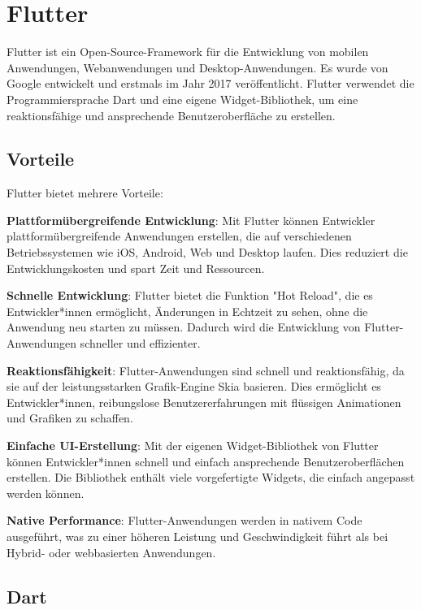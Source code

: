 \section{Flutter}
Flutter ist ein Open-Source-Framework für die Entwicklung von mobilen Anwendungen, Webanwendungen und Desktop-Anwendungen. 
Es wurde von Google entwickelt und erstmals im Jahr 2017 veröffentlicht. 
Flutter verwendet die Programmiersprache Dart und eine eigene Widget-Bibliothek, um eine reaktionsfähige und ansprechende Benutzeroberfläche zu erstellen.

\subsection{Vorteile}
Flutter bietet mehrere Vorteile:

\begin{compactitem}
    \item \textbf{Plattformübergreifende Entwicklung}: Mit Flutter können Entwickler plattformübergreifende Anwendungen erstellen, die auf verschiedenen Betriebssystemen wie iOS, 
    Android, Web und Desktop laufen. Dies reduziert die Entwicklungskosten und spart Zeit und Ressourcen.
    \item \textbf{Schnelle Entwicklung}: Flutter bietet die Funktion "Hot Reload", die es Entwickler*innen ermöglicht, Änderungen in Echtzeit zu sehen, 
    ohne die Anwendung neu starten zu müssen. Dadurch wird die Entwicklung von Flutter-Anwendungen schneller und effizienter.
    \item \textbf{Reaktionsfähigkeit}: Flutter-Anwendungen sind schnell und reaktionsfähig, da sie auf der leistungsstarken Grafik-Engine Skia basieren. 
    Dies ermöglicht es Entwickler*innen, reibungslose Benutzererfahrungen mit flüssigen Animationen und Grafiken zu schaffen.
    \item \textbf{Einfache UI-Erstellung}: Mit der eigenen Widget-Bibliothek von Flutter können Entwickler*innen schnell und einfach ansprechende Benutzeroberflächen erstellen. 
    Die Bibliothek enthält viele vorgefertigte Widgets, die einfach angepasst werden können.
    \item \textbf{Native Performance}: Flutter-Anwendungen werden in nativem Code ausgeführt, was zu einer höheren Leistung und Geschwindigkeit führt als bei Hybrid- oder webbasierten Anwendungen.
\end{compactitem}

\subsection{Dart}

